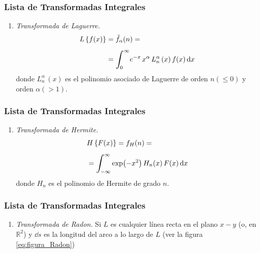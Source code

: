 \documentclass[12pt]{beamer}
\begin{document}
\begin{frame}
\frametitle{Lista de Transformadas Integrales}
\begin{enumerate}[<+->]
\conti
\item \emph{Transformada de Laguerre.}
\begin{align}
\begin{aligned}[b]
L \left\{ f (x) \right\} &= \tilde{f}_{\alpha} (n) = \\[0.5em]
&= \scaleint{6ex}_{\bs 0}^{\infty} e^{-x} \, x^{\alpha} \, L_{n}^{\alpha} \, (x) \, f (x) \dd{x}
\end{aligned}
\label{eq:ecuacion_16_2_1}
\end{align}
donde $L_{n}^{\alpha} \, (x)$ es el polinomio asociado de Laguerre de orden $n (\leq 0)$ y orden $\alpha (> 1)$.
\seti
\end{enumerate}
\end{frame}
\begin{frame}
\frametitle{Lista de Transformadas Integrales}
\begin{enumerate}[<+->]
\conti
\item \emph{Transformada de Hermite.}
\begin{align}
\begin{aligned}[b]
&H \left\{ F (x) \right\} = f_{H} (n) = \\[0.5em] 
&= \scaleint{6ex}_{\bs -\infty}^{\infty} \exp(-x^{2}) \, H_{n} (x) \, F (x) \dd{x}
\end{aligned}
\label{eq:ecuacion_17_2_1}
\end{align}
donde $H_{n}$ es el polinomio de Hermite de grado $n$.
\seti
\end{enumerate}
\end{frame}
\begin{frame}
\frametitle{Lista de Transformadas Integrales}
\begin{enumerate}[<+->]
\conti
\item \emph{Transformada de Radon.}
Si $L$ es cualquier línea recta en el plano $x-y$ (o, en $\mathbb{R}^{2}$) y $\dd{s}$ es la longitud del arco a lo largo de $L$ (ver la figura \ref{eq:figura_Radon})
\seti
\end{enumerate}
\end{frame}
\end{document}

